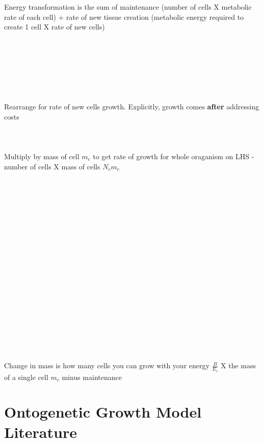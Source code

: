 \documentclass[a4paper]{article} %
\begin{document}
Energy transformation is the sum of maintenance (number of cells X metabolic rate of each cell) + rate of new tissue creation (metabolic energy required to create 1 cell X rate of new cells) \\ \\ \\ \\ \\ \\ \\ \\
Rearrange for rate of new cells growth. Explicitly, growth comes \textbf{after} addressing costs \\ \\ \\ \\
Multiply by mass of cell $m_{c}$ to get rate of growth for whole oraganism on LHS - number of cells X mass of cells $N_{c}m_{c}$ \\ \\ \\ \\ \\ \\ \\ \\ \\ \\ \\ \\ \\ \\ \\ \\ \\ \\ \\ \\
Change in mass is how many cells you can grow with your energy $\frac{B}{E_c}$ X the mass of a single cell $m_c$ minus maintenance 
\newpage
\section{Ontogenetic Growth Model Literature}
\end{document}
